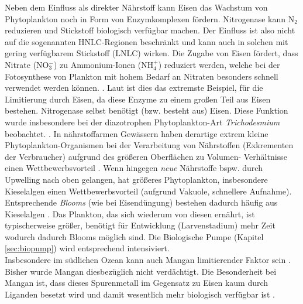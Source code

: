 \documentclass[12pt,a4paper,onecolumn]{scrartcl}
\begin{document}
Neben dem Einfluss als direkter Nährstoff kann Eisen das Wachstum von Phytoplankton noch in Form von Enzymkomplexen fördern.  Nitrogenase kann N$_2$ reduzieren und Stickstoff biologisch verfügbar machen. Der Einfluss ist also nicht auf die sogenannten HNLC-Regionen beschränkt und kann auch in solchen mit gering verfügbarem Stickstoff (LNLC) wirken. Die Zugabe von Eisen fördert, dass Nitrate (NO$_3^-$) zu Ammonium-Ionen (NH$_4^+$) reduziert werden, welche bei der Fotosynthese von Plankton mit hohem Bedarf an Nitraten besonders schnell verwendet werden können.  \citep{Emerson.2009}. Laut \citet{Emerson.2009} ist dies das extremste Beispiel, für die Limitierung durch Eisen, da diese Enzyme zu einem großen Teil aus Eisen bestehen. Nitrogenase selbst benötigt (bzw. besteht aus) Eisen. Diese Funktion wurde insbesondere bei der diazotrophen Phytoplankton-Art \textit{Trichodesmium} beobachtet. \citep{Falkowski.1998}.  In nährstoffarmen Gewässern haben derartige extrem kleine Phytoplankton-Organismen bei der Verarbeitung von Nährstoffen (Exkrementen der Verbraucher)  aufgrund des größeren Oberflächen zu Volumen- Verhältnisse einen Wettbewerbsvorteil \citep{Falkowski.1998}. Wenn hingegen \textit{neue} Nährstoffe bspw. durch Upwelling nach oben gelangen, hat größeres Phytoplankton, insbesondere Kieselalgen einen Wettbewerbsvorteil (aufgrund Vakuole, schnellere Aufnahme). Entsprechende \textit{Blooms} (wie bei Eisendüngung) bestehen dadurch häufig aus Kieselalgen \citep{Boyd.2007}. Das Plankton, das sich wiederum von diesen ernährt, ist typischerweise größer, benötigt für Entwicklung (Larvenstadium) mehr Zeit wodurch dadurch Blooms möglich sind. Die Biologische Pumpe (Kapitel \ref{sec:biopump}) wird entsprechend intensiviert. \\

Insbesondere im südlichen Ozean kann auch Mangan limitierender Faktor sein \citep{Browning.2021}. Bisher wurde Mangan diesbezüglich nicht verdächtigt. Die Besonderheit bei Mangan ist, dass dieses Spurenmetall im Gegensatz zu Eisen kaum durch Liganden besetzt wird und damit wesentlich mehr biologisch verfügbar ist \citep{Emerson.2009}. 
\end{document}
